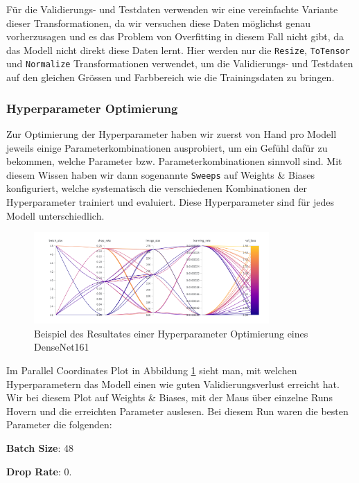 \documentclass{article}
\begin{document}
Für die Validierungs- und Testdaten verwenden wir eine vereinfachte Variante dieser Transformationen, da wir versuchen diese Daten möglichst genau vorherzusagen und es das Problem von Overfitting in diesem Fall nicht gibt, da das Modell nicht direkt diese Daten lernt. Hier werden nur die \texttt{Resize}, \texttt{ToTensor} und \texttt{Normalize} Transformationen verwendet, um die Validierungs- und Testdaten auf den gleichen Grössen und Farbbereich wie die Trainingsdaten zu bringen.

\subsubsection{Hyperparameter Optimierung}
Zur Optimierung der Hyperparameter haben wir zuerst von Hand pro Modell jeweils einige Parameterkombinationen ausprobiert, um ein Gefühl dafür zu bekommen, welche Parameter bzw. Parameterkombinationen sinnvoll sind. Mit diesem Wissen haben wir dann sogenannte \texttt{Sweeps} auf Weights \& Biases konfiguriert, welche systematisch die verschiedenen Kombinationen der Hyperparameter trainiert und evaluiert. Diese Hyperparameter sind für jedes Modell unterschiedlich.

\begin{figure}[!h]
    \centering
    \includegraphics[width=0.8\textwidth]{images/hyperparameter_optimization_example.png}
    \caption{\label{fig:hyperparameter_optimization_example}Beispiel des Resultates einer Hyperparameter Optimierung eines DenseNet161}
\end{figure}

Im Parallel Coordinates Plot in Abbildung \ref{fig:hyperparameter_optimization_example} sieht man, mit welchen Hyperparametern das Modell einen wie guten Validierungsverlust erreicht hat. Wir bei diesem Plot auf Weights \& Biases, mit der Maus über einzelne Runs Hovern und die erreichten Parameter auslesen. Bei diesem Run waren die besten Parameter die folgenden:

\textbf{Batch Size}: 48

\textbf{Drop Rate}: 0.
\end{document}
